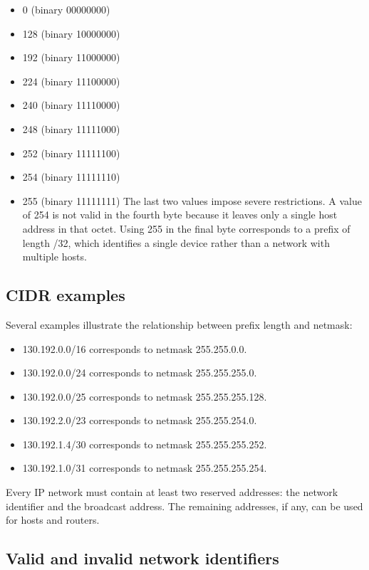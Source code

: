 \documentclass[11pt,a4paper,openany]{report}
\begin{document}
\begin{itemize}
\item 0 (binary 00000000)
\item 128 (binary 10000000)
\item 192 (binary 11000000)
\item 224 (binary 11100000)
\item 240 (binary 11110000)
\item 248 (binary 11111000)
\item 252 (binary 11111100)
\item 254 (binary 11111110)
\item 255 (binary 11111111) The last two values impose severe restrictions. A value of 254 is not valid in the fourth byte because it leaves only a single host address in that octet. Using 255 in the final byte corresponds to a prefix of length /32, which identifies a single device rather than a network with multiple hosts.
\end{itemize}

\subsection{CIDR examples}

Several examples illustrate the relationship between prefix length and netmask:

\begin{itemize}
\item 130.192.0.0/16 corresponds to netmask 255.255.0.0.
\item 130.192.0.0/24 corresponds to netmask 255.255.255.0.
\item 130.192.0.0/25 corresponds to netmask 255.255.255.128.
\item 130.192.2.0/23 corresponds to netmask 255.255.254.0.
\item 130.192.1.4/30 corresponds to netmask 255.255.255.252.
\item 130.192.1.0/31 corresponds to netmask 255.255.255.254.
\end{itemize}

Every IP network must contain at least two reserved addresses: the network identifier and the broadcast address. The remaining addresses, if any, can be used for hosts and routers.

\subsection{Valid and invalid network identifiers}
\end{document}
